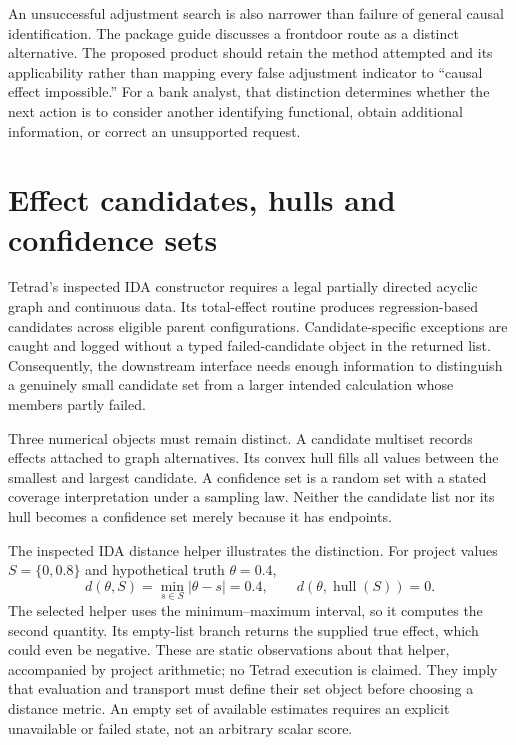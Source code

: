 An unsuccessful adjustment search is also narrower than failure of general
causal identification. The package guide discusses a frontdoor route as a
distinct alternative. The proposed product should retain the method attempted
and its applicability rather than mapping every false adjustment indicator to
``causal effect impossible.'' For a bank analyst, that distinction determines
whether the next action is to consider another identifying functional, obtain
additional information, or correct an unsupported request.

\section{Effect candidates, hulls and confidence sets}

Tetrad's inspected IDA constructor requires a legal partially directed acyclic
graph and continuous data. Its total-effect routine produces regression-based
candidates across eligible parent configurations. Candidate-specific exceptions
are caught and logged without a typed failed-candidate object in the returned
list. Consequently, the downstream interface needs enough information to
distinguish a genuinely small candidate set from a larger intended calculation
whose members partly failed.\cite{v12_sw_tetrad}

Three numerical objects must remain distinct. A candidate multiset records
effects attached to graph alternatives. Its convex hull fills all values
between the smallest and largest candidate. A confidence set is a random set
with a stated coverage interpretation under a sampling law. Neither the
candidate list nor its hull becomes a confidence set merely because it has
endpoints.

The inspected IDA distance helper illustrates the distinction. For project
values \(S=\{0,0.8\}\) and hypothetical truth \(\theta=0.4\),
\[
 d(\theta,S)=\min_{s\in S}|\theta-s|=0.4,
 \qquad d(\theta,\operatorname{hull}(S))=0.
\]
The selected helper uses the minimum--maximum interval, so it computes the
second quantity. Its empty-list branch returns the supplied true effect, which
could even be negative. These are static observations about that helper,
accompanied by project arithmetic; no Tetrad execution is claimed. They imply
that evaluation and transport must define their set object before choosing a
distance metric. An empty set of available estimates requires an explicit
unavailable or failed state, not an arbitrary scalar score.\cite{v12_sw_tetrad}

